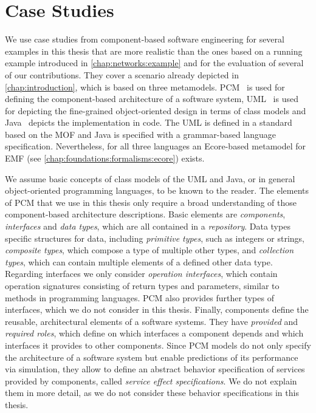 \section{Case Studies}
\label{chap:foundations:case_studies}

We use case studies from component-based software engineering for several examples in this thesis that are more realistic than the ones based on a running example introduced in \autoref{chap:networks:example} and for the evaluation of several of our contributions.
They cover a scenario already depicted in \autoref{chap:introduction}, which is based on three metamodels.
\gls{PCM}~\cite{reussner2016a} is used for defining the component-based architecture of a software system, \gls{UML}~\cite{uml} is used for depicting the fine-grained object-oriented design in terms of class models and Java~\cite{gosling2018jls-specification} depicts the implementation in code.
The \gls{UML} is defined in a standard based on the \gls{MOF} and Java is specified with a grammar-based language specification.
Nevertheless, for all three languages an Ecore-based metamodel for \gls{EMF} (see \autoref{chap:foundations:formalisms:ecore}) exists.

We assume basic concepts of class models of the \gls{UML} and Java, or in general object-oriented programming languages, to be known to the reader.
The elements of \gls{PCM} that we use in this thesis only require a broad understanding of those component-based architecture descriptions.
Basic elements are \emph{components}, \emph{interfaces} and \emph{data types}, which are all contained in a \emph{repository}.
Data types specific structures for data, including \emph{primitive types}, such as integers or strings, \emph{composite types}, which compose a type of multiple other types, and \emph{collection types}, which can contain multiple elements of a defined other data type.
Regarding interfaces we only consider \emph{operation interfaces}, which contain operation signatures consisting of return types and parameters, similar to methods in programming languages.
\gls{PCM} also provides further types of interfaces, which we do not consider in this thesis.
Finally, components define the reusable, architectural elements of a software systems.
They have \emph{provided} and \emph{required roles}, which define on which interfaces a component depends and which interfaces it provides to other components.
Since \gls{PCM} models do not only specify the architecture of a software system but enable predictions of its performance via simulation, they allow to define an abstract behavior specification of services provided by components, called \emph{service effect specifications}.
We do not explain them in more detail, as we do not consider these behavior specifications in this thesis.

